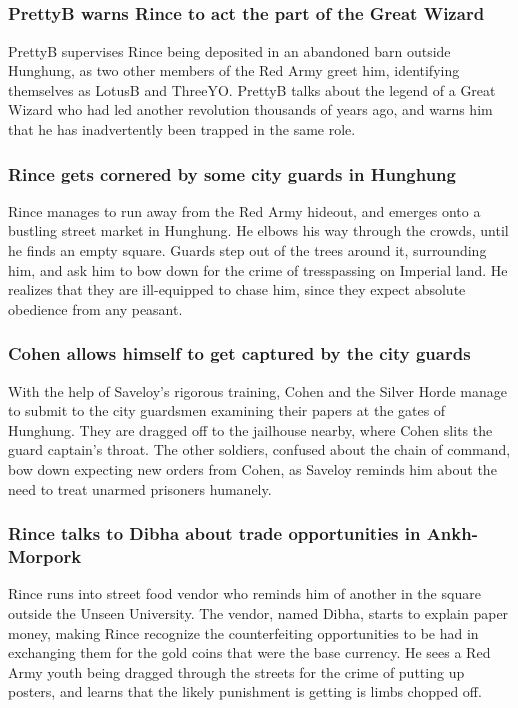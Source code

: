 \subsection{}
\subsubsection{\Gls{PrettyB} warns \Gls{Rince} to act the part of the Great Wizard}
\Gls{PrettyB} supervises \Gls{Rince} being deposited in an abandoned barn outside Hunghung, as two
other members of the Red Army greet him, identifying themselves as \Gls{LotusB} and \Gls{ThreeYO}.
\Gls{PrettyB} talks about the legend of a Great Wizard who had led another revolution thousands of
years ago, and warns him that he has inadvertently been trapped in the same role.

\subsubsection{\Gls{Rince} gets cornered by some city guards in Hunghung}
\Gls{Rince} manages to run away from the Red Army hideout, and emerges onto a bustling street market
in Hunghung. He elbows his way through the crowds, until he finds an empty square. Guards step out
of the trees around it, surrounding him, and ask him to bow down for the crime of tresspassing on
Imperial land. He realizes that they are ill-equipped to chase him, since they expect absolute
obedience from any peasant.

\subsubsection{\Gls{Cohen} allows himself to get captured by the city guards}
With the help of \Gls{Saveloy}'s rigorous training, \Gls{Cohen} and the Silver Horde manage to
submit to the city guardsmen examining their papers at the gates of Hunghung. They are dragged off
to the jailhouse nearby, where \Gls{Cohen} slits the guard captain's throat. The other soldiers,
confused about the chain of command, bow down expecting new orders from \Gls{Cohen}, as
\Gls{Saveloy} reminds him about the need to treat unarmed prisoners humanely.

\subsubsection{\Gls{Rince} talks to \Gls{Dibha} about trade opportunities in Ankh-Morpork}
\Gls{Rince} runs into street food vendor who reminds him of another in the square outside the
Unseen University. The vendor, named \Gls{Dibha}, starts to explain paper money, making \Gls{Rince}
recognize the counterfeiting opportunities to be had in exchanging them for the gold coins that were
the base currency. He sees a Red Army youth being dragged through the streets for the crime of
putting up posters, and learns that the likely punishment is getting is limbs chopped off.


